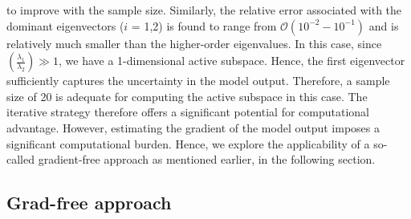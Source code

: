 to improve with the sample size. Similarly, the relative error associated with the dominant eigenvectors
($i$ = 1,2) is found to range from $\mathcal{O}(10^{-2} - 10^{-1})$ and is relatively much smaller than 
the higher-order eigenvalues. In this case, since $\left(\frac{\lambda_1}{\lambda_2}\right)\gg 1$, we have
a 1-dimensional active subspace. Hence, the first eigenvector sufficiently captures the uncertainty in
the  model output. Therefore, a sample size of 20 is adequate for computing the active subspace in this
case. The iterative strategy therefore offers a significant potential for computational advantage. 
However, estimating the gradient of the model output imposes a significant computational burden.
Hence, we explore the applicability of a so-called gradient-free approach as mentioned earlier, in the
following section.  

\subsection{Grad-free approach}
\label{sub:gradfree}

